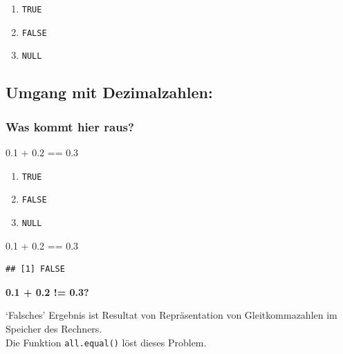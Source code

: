 \documentclass[
]{book}
\newenvironment{Shaded}{\begin{snugshade}}{\end{snugshade}}
\newcommand{\FloatTok}[1]{\textcolor[rgb]{0.00,0.00,0.81}{#1}}
\newcommand{\SpecialCharTok}[1]{\textcolor[rgb]{0.00,0.00,0.00}{#1}}
\providecommand{\tightlist}{%
  \setlength{\itemsep}{0pt}\setlength{\parskip}{0pt}}
\begin{document}
\begin{enumerate}
\def\labelenumi{\Alph{enumi})}
\tightlist
\item
  \texttt{TRUE}
\item
  \texttt{FALSE}
\item
  \texttt{NULL}
\end{enumerate}

\hypertarget{umgang-mit-dezimalzahlen}{%
\subsection*{Umgang mit Dezimalzahlen:}\label{umgang-mit-dezimalzahlen}}

\hypertarget{was-kommt-hier-raus}{%
\subsubsection*{Was kommt hier raus?}\label{was-kommt-hier-raus}}

\begin{Shaded}
\begin{Highlighting}[]
\FloatTok{0.1} \SpecialCharTok{+} \FloatTok{0.2} \SpecialCharTok{==} \FloatTok{0.3}
\end{Highlighting}
\end{Shaded}

\begin{enumerate}
\def\labelenumi{\Alph{enumi})}
\tightlist
\item
  \texttt{TRUE}
\item
  \texttt{FALSE}
\item
  \texttt{NULL}
\end{enumerate}

\begin{Shaded}
\begin{Highlighting}[]
\FloatTok{0.1} \SpecialCharTok{+} \FloatTok{0.2} \SpecialCharTok{==} \FloatTok{0.3}
\end{Highlighting}
\end{Shaded}

\begin{verbatim}
## [1] FALSE
\end{verbatim}

\textbf{0.1 + 0.2 != 0.3?}

`Falsches' Ergebnis ist Resultat von Repräsentation von Gleitkommazahlen im Speicher des Rechners.\\
Die Funktion \texttt{all.equal()} löst dieses Problem.
\end{document}
